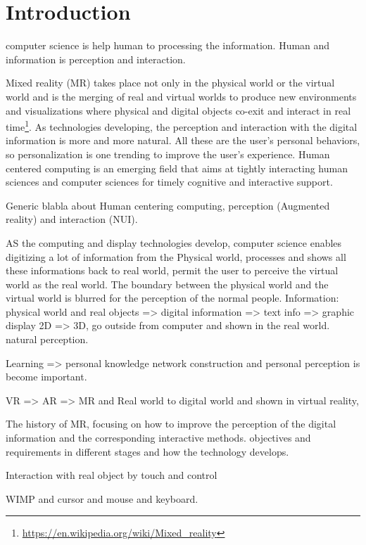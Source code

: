 %

\chapter{Introduction}  %
\label{sec:introduction}
computer science is help human to processing the information. Human and information is perception and interaction. 

Mixed reality (MR) takes place not only in the physical world or the virtual world and is the merging of real and virtual worlds to produce new environments and visualizations where physical and digital objects co-exit and interact in real time\footnote{\url{https://en.wikipedia.org/wiki/Mixed_reality}}.
As technologies developing, the perception and interaction with the digital information is more and more natural. All these are the user's personal behaviors, so personalization is one trending to improve the user's experience.
Human centered computing is an emerging field that aims at tightly interacting human sciences and computer sciences for timely cognitive and interactive support.

Generic blabla about Human centering computing, perception (Augmented reality) and interaction (NUI).

AS the computing and display technologies develop, computer science enables digitizing a lot of information from the Physical world, processes and shows all these informations back to real world, permit the user to perceive the virtual world as the real world. The boundary between the physical world and the virtual world is blurred for the perception of the normal people. 
Information: physical world and real objects => digital information => text info => graphic display 
2D => 3D, go outside from computer and shown in the real world. natural perception.

Learning => personal knowledge network construction and personal perception is become important.

VR => AR => MR and 
Real world to digital world and shown in virtual reality, 

The history of MR, focusing on how to improve the perception of the digital information and the corresponding interactive methods. objectives and requirements in different stages and how the technology develops.

Interaction with real object by touch and control 

WIMP and cursor and mouse  and keyboard.

